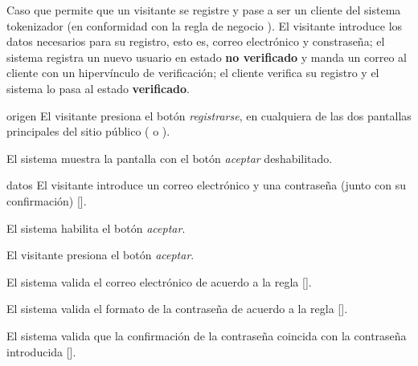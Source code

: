 %
%

{
  Caso que permite que un visitante se registre y pase a ser
  un cliente del sistema tokenizador (en conformidad con la regla de negocio
  ). El visitante introduce los datos
  necesarios para su registro, esto es, correo electrónico y constraseña; el
  sistema registra un nuevo usuario en estado \textbf{no verificado} y manda un
  correo al cliente con un hipervínculo de verificación; el cliente verifica su
  registro y el sistema lo pasa al estado \textbf{verificado}.

  \begin{trayectoriaPrincipal}

    \item[origen] El visitante presiona el botón \textit{registrarse}, en
      cualquiera de las dos pantallas principales del sitio público
      ( o ).

    \item El sistema muestra la pantalla
       con el botón \textit{aceptar}
      deshabilitado.

    \item[datos] El visitante introduce un correo electrónico y una contraseña
      (junto con su confirmación) [].

    \item El sistema habilita el botón \textit{aceptar}.

    \item El visitante presiona el botón \textit{aceptar}.

    \item El sistema valida el correo electrónico de acuerdo a la regla
      [].

    \item El sistema valida el formato de la contraseña de acuerdo a la regla
      [].

    \item El sistema valida que la confirmación de la contraseña coincida con
      la contraseña introducida
      [].


\end{trayectoriaPrincipal}}
